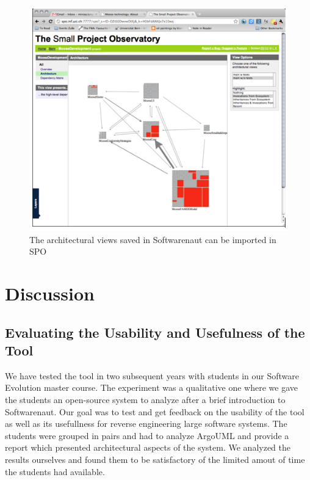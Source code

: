 \documentclass[preprint,12pt]{elsarticle}
\begin{document}
\begin{figure}[th!]
\begin{center}
\includegraphics[width=\linewidth]{images/SpoIntegration.png}
\caption{The architectural views saved in Softwarenaut can be imported in SPO}
\label{}
\end{center}
\end{figure}



\section {Discussion}
\subsection {Evaluating the Usability and Usefulness of the Tool}
We have tested the tool in two subsequent years with students in our Software Evolution master course. The experiment was a qualitative one where we gave the students an open-source system to analyze after a brief introduction to Softwarenaut. Our goal was to test and get feedback on the usability of the tool as well as its usefullness for reverse engineering large software systems. The students were grouped in pairs and had to analyze ArgoUML and provide a report which presented architectural aspects of the system. We analyzed the results ourselves and found them to be satisfactory of the limited amout of time the students had available. 
\end{document}
